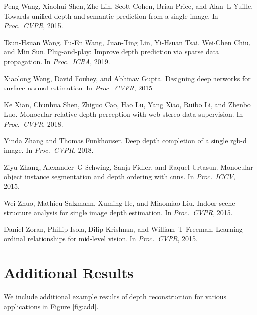 \documentclass[10pt,twocolumn,letterpaper]{article}
\begin{document}
{\begin{thebibliography}{10}
Peng Wang, Xiaohui Shen, Zhe Lin, Scott Cohen, Brian Price, and Alan~L Yuille.
\newblock Towards unified depth and semantic prediction from a single image.
\newblock In {\em Proc.~CVPR}, 2015.

Tsun-Hsuan Wang, Fu-En Wang, Juan-Ting Lin, Yi-Hsuan Tsai, Wei-Chen Chiu, and
  Min Sun.
\newblock Plug-and-play: Improve depth prediction via sparse data propagation.
\newblock In {\em Proc.~ICRA}, 2019.

\newpage

Xiaolong Wang, David Fouhey, and Abhinav Gupta.
\newblock Designing deep networks for surface normal estimation.
\newblock In {\em Proc.~CVPR}, 2015.

Ke Xian, Chunhua Shen, Zhiguo Cao, Hao Lu, Yang Xiao, Ruibo Li, and Zhenbo Luo.
\newblock Monocular relative depth perception with web stereo data supervision.
\newblock In {\em Proc.~CVPR}, 2018.

Yinda Zhang and Thomas Funkhouser.
\newblock Deep depth completion of a single rgb-d image.
\newblock In {\em Proc.~CVPR}, 2018.

Ziyu Zhang, Alexander~G Schwing, Sanja Fidler, and Raquel Urtasun.
\newblock Monocular object instance segmentation and depth ordering with cnns.
\newblock In {\em Proc.~ICCV}, 2015.

Wei Zhuo, Mathieu Salzmann, Xuming He, and Miaomiao Liu.
\newblock Indoor scene structure analysis for single image depth estimation.
\newblock In {\em Proc.~CVPR}, 2015.

Daniel Zoran, Phillip Isola, Dilip Krishnan, and William~T Freeman.
\newblock Learning ordinal relationships for mid-level vision.
\newblock In {\em Proc.~CVPR}, 2015.

\end{thebibliography}
 }

\clearpage

\newcommand{\conv}[1]{conv #1$\times$#1}
\newcommand{\dconv}[1]{conv\_transpose #1$\times$#1}
\onecolumn

\appendix


\section{Additional Results}

We include additional example results of depth reconstruction for various applications in Figure \ref{fig:add}.
\end{document}
